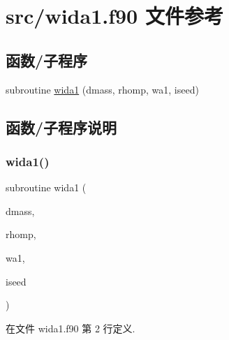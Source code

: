 \hypertarget{wida1_8f90}{}\section{src/wida1.f90 文件参考}
\label{wida1_8f90}
\subsection*{函数/子程序}
\begin{DoxyCompactItemize}
\item 
subroutine \mbox{\hyperlink{wida1_8f90_a5a6082681397421fa67d1379dab48ded}{wida1}} (dmass, rhomp, wa1, iseed)
\end{DoxyCompactItemize}


\subsection{函数/子程序说明}
\mbox{\label{wida1_8f90_a5a6082681397421fa67d1379dab48ded}} 
\subsubsection{\texorpdfstring{wida1()}{wida1()}}
{\footnotesize\ttfamily subroutine wida1 (\begin{DoxyParamCaption}\item[{}]{dmass,  }\item[{}]{rhomp,  }\item[{}]{wa1,  }\item[{}]{iseed }\end{DoxyParamCaption})}



在文件 wida1.\+f90 第 2 行定义.

